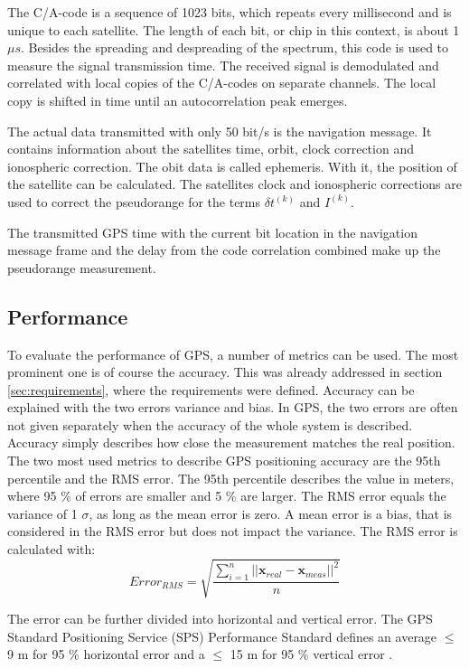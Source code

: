 The C/A-code is a sequence of 1023 bits, which repeats every millisecond and is unique to each satellite.
The length of each bit, or chip in this context, is about 1 $\mu s$.
Besides the spreading and despreading of the spectrum, this code is used to measure the signal transmission time.
The received signal is demodulated and correlated with local copies of the C/A-codes on separate channels.
The local copy is shifted in time until an autocorrelation peak emerges.

The actual data transmitted with only 50 bit/s is the navigation message.
It contains information about the satellites time, orbit, clock correction and ionospheric correction.
The obit data is called ephemeris.
With it, the position of the satellite can be calculated.
The satellites clock and ionospheric corrections are used to correct the pseudorange for the terms $\delta t^{(k)}$ and $I^{(k)}$.

The transmitted GPS time with the current bit location in the navigation message frame and the delay from the code correlation combined make up the pseudorange measurement.

\subsection{Performance}

To evaluate the performance of GPS, a number of metrics can be used.
The most prominent one is of course the accuracy.
This was already addressed in section \ref{sec:requirements}, where the requirements were defined.
Accuracy can be explained with the two errors variance and bias.
In GPS, the two errors are often not given separately when the accuracy of the whole system is described.
Accuracy simply describes how close the measurement matches the real position.
The two most used metrics to describe GPS positioning accuracy are the 95th percentile and the RMS error.
The 95th percentile describes the value in meters, where 95 \% of errors are smaller and 5 \% are larger.
The RMS error equals the variance of 1 $\sigma$, as long as the mean error is zero.
A mean error is a bias, that is considered in the RMS error but does not impact the variance.
The RMS error is calculated with:
\begin{equation}
 Error_{RMS} = \sqrt{\frac{\sum\limits_{i=1}^n \lvert\lvert \textbf{x}_{real} - \textbf{x}_{meas} \rvert\rvert^2}{n}}
\end{equation}

The error can be further divided into horizontal and vertical error.
The GPS Standard Positioning Service (SPS) Performance Standard defines an average $\leq$ 9 m for 95 \% horizontal error and a $\leq$ 15 m for 95 \% vertical error \cite{SPS_Performance}.

